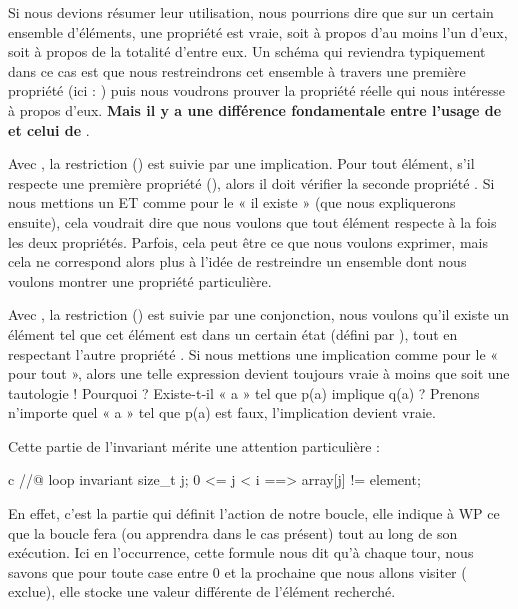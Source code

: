 Si nous devions résumer leur utilisation, nous pourrions dire que sur un certain
ensemble d'éléments, une propriété est vraie, soit à propos d'au moins l'un
d'eux, soit à propos de la totalité d'entre eux. Un schéma qui reviendra
typiquement dans ce cas est que nous restreindrons cet ensemble à travers une
première propriété (ici : ) puis nous voudrons prouver la
propriété réelle qui nous intéresse à propos d'eux. \textbf{Mais il y a une
différence fondamentale entre l'usage de  et celui de }.



Avec , la restriction () est suivie
par une implication. Pour tout élément, s'il respecte une première propriété
(), alors il doit vérifier la seconde propriété . Si nous mettions un ET
comme pour le « il existe » (que nous expliquerons ensuite), cela voudrait dire que
nous voulons que tout élément respecte à la fois les deux propriétés. Parfois,
cela peut être ce que nous voulons exprimer, mais cela ne correspond alors plus
à l'idée de restreindre un ensemble dont nous voulons montrer une propriété
particulière.



Avec , la restriction () est suivie
par une conjonction, nous voulons qu'il existe un élément tel que cet élément
est dans un certain état (défini par ), tout en respectant l'autre
propriété . Si nous mettions une implication comme pour le « pour tout »,
alors une telle expression devient toujours vraie à moins que  soit une
tautologie ! Pourquoi ? Existe-t-il « a » tel que p(a) implique q(a) ? Prenons
n'importe quel « a » tel que p(a) est faux, l'implication devient vraie.



Cette partie de l'invariant mérite une attention particulière :



\begin{CodeBlock}{c}
//@ loop invariant \forall size_t j; 0 <= j < i ==> array[j] != element;
\end{CodeBlock}



En effet, c'est la partie qui définit l'action de notre boucle, elle indique à
WP ce que la boucle fera (ou apprendra dans le cas présent) tout au long de
son exécution. Ici en l'occurrence, cette formule nous dit qu'à chaque tour,
nous savons que pour toute case entre 0 et la prochaine que nous allons visiter
( exclue), elle stocke une valeur différente de l'élément
recherché.



